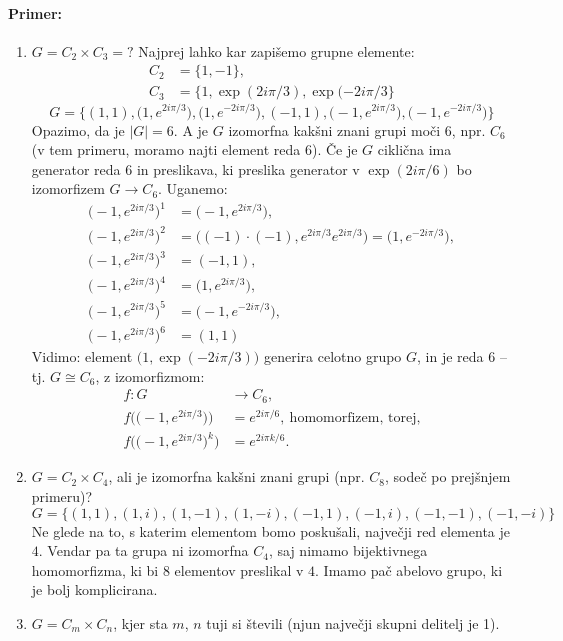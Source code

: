 \paragraph{Primer:}
\begin{enumerate}
	\item{$G = C_2 \times C_3 = ?$\vspace{0.5ex}
		Najprej lahko kar zapi\v semo grupne elemente:
		\begin{align*}
			C_2 &= \{1, -1\}, \\
			C_3 &= \{1, \exp(2i\pi/3), \exp(-2i\pi/3\}
		\end{align*}
		\[
			G = \big\{(1,1), \big(1,e^{2i\pi/3}\big), \big(1,e^{-2i\pi/3}\big), 
				(-1,1), \big(-1, e^{2i\pi/3}\big), \big(-1, e^{-2i\pi/3}\big)\big\}
		\]
		\ni Opazimo, da je $|G| = 6$. A je $G$ izomorfna kak\v sni znani grupi mo\v ci 6,
		npr. $C_6$ (v tem primeru, moramo najti element reda 6). \v Ce je $G$ cikli\v cna ima generator reda $6$
		in preslikava, ki preslika generator v $\exp(2i\pi/6)$ bo izomorfizem $G \to C_6$. Uganemo:
		\begin{align*}
			\big(-1, e^{2i\pi/3}\big)^1 &= \big(-1, e^{2i\pi/3}\big), \\
			\big(-1, e^{2i\pi/3}\big)^2 &= \big((-1)\cdot(-1), e^{2i\pi/3} e^{2i\pi/3}\big) = \big(1, e^{-2i\pi/3}\big), \\
			\big(-1, e^{2i\pi/3}\big)^3 &= (-1, 1), \\
			\big(-1, e^{2i\pi/3}\big)^4 &= \big(1, e^{2i\pi/3}\big), \\
			\big(-1, e^{2i\pi/3}\big)^5 &= \big(-1, e^{-2i\pi/3}\big), \\
			\big(-1, e^{2i\pi/3}\big)^6 &= (1,1)
		\end{align*}
		Vidimo: element $\big(1, \exp(-2i\pi/3)\big)$ generira celotno grupo $G$, in je reda 6 -- tj. $G \cong C_6$, z
		izomorfizmom:
		\begin{align*}
			f : G &\to C_6, \\
			f\Big(\big(-1, e^{2i\pi/3}\big)\Big) &= e^{2i\pi/6},\ \text{homomorfizem, torej,} \\
			f\Big(\big(-1, e^{2i\pi/3}\big)^k\Big) &= e^{2i\pi k/6}.
		\end{align*}
	}
	\item{
		$G = C_2 \times C_4$, ali je izomorfna kak\v sni znani grupi (npr. $C_8$, sode\v c po prej\v snjem primeru)?
		\[
			G = \{(1,1), (1, i), (1, -1), (1, -i), (-1, 1), (-1, i), (-1, -1), (-1, -i)\}
		\]
		Ne glede na to, s katerim elementom bomo posku\v sali, najve\v cji red elementa je $4$. Vendar pa ta grupa ni izomorfna $C_4$, saj
		nimamo bijektivnega homomorfizma, ki bi $8$ elementov preslikal v $4$. Imamo pa\v c abelovo grupo, ki je bolj komplicirana.
	}
	\item{
		$G = C_m \times C_n$, kjer sta $m$, $n$ tuji si \v stevili (njun najve\v cji skupni delitelj je 1).
}
\end{enumerate}
